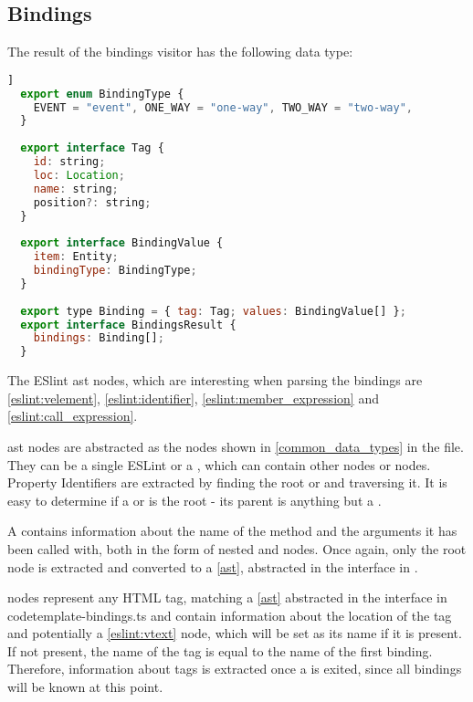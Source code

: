 \subsection{Bindings}
The result of the bindings visitor has the following data type:
\begin{lstlisting}[language=JavaScript,caption={Result data types bindings}, captionpos=b]]
  export enum BindingType {
    EVENT = "event", ONE_WAY = "one-way", TWO_WAY = "two-way",
  }
  
  export interface Tag {
    id: string;
    loc: Location;
    name: string;
    position?: string;
  }
  
  export interface BindingValue {
    item: Entity;
    bindingType: BindingType;
  }
  
  export type Binding = { tag: Tag; values: BindingValue[] };
  export interface BindingsResult {
    bindings: Binding[];
  }
\end{lstlisting}

The ESlint \gls{ast} nodes, which are interesting when parsing the bindings are  \ref{eslint:velement}, 
 \ref{eslint:identifier},  \ref{eslint:member_expression} and  \ref{eslint:call_expression}. 

\gls{ast}  nodes are abstracted as the nodes shown in \ref{common_data_types}
in the  file. They can be a single ESLint  or a , which can contain other  nodes or  nodes. Property Identifiers are extracted by finding the root  or  and traversing it. It is easy to determine if a  or  is the root - its parent is anything but a .

A  contains information about the name of the method and the arguments it has been called with, both in the form of nested  and  nodes. Once again, only the root  node is extracted and converted to a  \ref{ast}, abstracted in the  interface in .

 nodes represent any HTML tag, matching a  \ref{ast} abstracted in the  interface in code{template-bindings.ts} and contain information about the location of the tag and potentially a  \ref{eslint:vtext} node, which will be set as its name if it is present. If not present, the name of the tag is equal to the name of the first binding. Therefore, information about tags is extracted once a  is exited, since all bindings will be known at this point.

